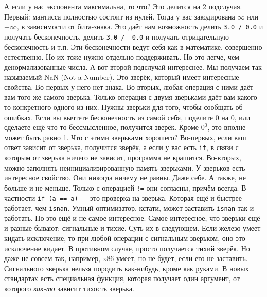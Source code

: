 \documentclass{article}
\begin{document}
    А если у нас экспонента максимальна, то что? Это делится на 2 подслучая. Первый: мантисса полностью состоит из нулей. Тогда у вас закодирована $\infty$ или $-\infty$, в зависимости от бита-знака. Это даёт нам возможность делить \texttt{3.0 / 0.0} и получать бесконечность, делить \texttt{3.0 / -0.0} и получать отрицательную бесконечность и т.п. Эти бесконечности ведут себя как в математике, совершенно естественно. Но их тоже нужно отдельно поддерживать. Но это легче, чем денормализованные числа. А вот второй подслучай интереснее. Мы получаем так называемый NaN (Not a Number). Это зверёк, который имеет интересные свойства. Во-первых у него нет знака. Во-вторых, любая операция с ними даёт вам того же самого зверька. Только операция с двумя зверьками даёт вам какого-то конкретного одного из них. Нужны зверьки для того, чтобы сообщать об ошибках. Если вы вычтете бесконечность из самой себя, поделите 0 на 0, или сделаете ещё что-то бессмысленное, получится зверёк. Кроме $0^0$, это вполне может быть равно 1. Что с этими зверьками хорошего? Во-первых, если ваш ответ зависит от зверька, получится зверёк, а если у вас есть \texttt{if}, в связи с которым от зверька ничего не зависит, программа не крашится. Во-вторых, можно заполнять неинициализированную память зверьками. У зверьков есть интересное свойство. Они никогда ничему не равны. Даже себе. А также, не больше и не меньше. Только с операцией \texttt{!=} они согласны, причём всегда. В частности \texttt{if (a == a)} --- это проверка на зверька. Которая ещё и быстрее работает, чем \texttt{isnan}. Умный оптимизатор, кстати, может заставить \texttt{isnan} так и работать. Но это ещё и не самое интересное. Самое интересное, что зверьки ещё и разные бывают: сигнальные и тихие. Суть их в следующем. Если железо умеет кидать исключение, то при любой операции с сигнальным зверьком, оно это исключение кидает. В противном случае, просто получается тихий зверёк. Но даже не совсем так, например, x86 умеет, но не будет, если его не заставить. Сигнального зверька нельзя породить как-нибудь, кроме как руками. В новых стандартах есть специальная функция, которая получает один аргумент, от которого \textit{как-то} зависит тихость зверька.\\
\end{document}
